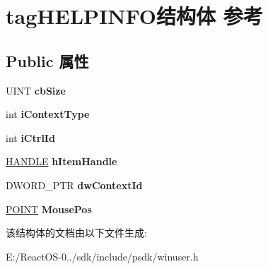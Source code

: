\hypertarget{structtag_h_e_l_p_i_n_f_o}{}\section{tag\+H\+E\+L\+P\+I\+N\+F\+O结构体 参考}
\label{structtag_h_e_l_p_i_n_f_o}
\subsection*{Public 属性}
\begin{DoxyCompactItemize}
\item 
\mbox{\label{structtag_h_e_l_p_i_n_f_o_af6fbafbbbce940735fd5fef9cb08e6bd}} 
U\+I\+NT {\bfseries cb\+Size}
\item 
\mbox{\label{structtag_h_e_l_p_i_n_f_o_af1dfaa4e829296085fabffcbcbdf8b09}} 
int {\bfseries i\+Context\+Type}
\item 
\mbox{\label{structtag_h_e_l_p_i_n_f_o_a554444398e3a025d9498abcc6c8c920a}} 
int {\bfseries i\+Ctrl\+Id}
\item 
\mbox{\label{structtag_h_e_l_p_i_n_f_o_a870933727cd08917b233722133f4195e}} 
\hyperlink{interfacevoid}{H\+A\+N\+D\+LE} {\bfseries h\+Item\+Handle}
\item 
\mbox{\label{structtag_h_e_l_p_i_n_f_o_a6a114e8a28f335b2e523a57575ac5bf9}} 
D\+W\+O\+R\+D\+\_\+\+P\+TR {\bfseries dw\+Context\+Id}
\item 
\mbox{\label{structtag_h_e_l_p_i_n_f_o_a056fc06f612c69186fa8953028f8e275}} 
\hyperlink{structtag_p_o_i_n_t}{P\+O\+I\+NT} {\bfseries Mouse\+Pos}
\end{DoxyCompactItemize}


该结构体的文档由以下文件生成\+:\begin{DoxyCompactItemize}
\item 
E\+:/\+React\+O\+S-\/0../sdk/include/psdk/winuser.\+h\end{DoxyCompactItemize}
